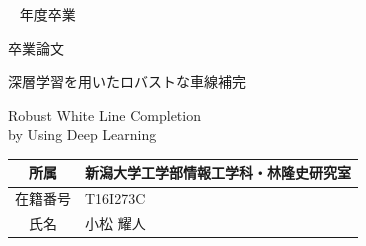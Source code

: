 \documentclass[a4j, 11pt]{jreport}
\newcounter{fiscal_year}         %
\begin{document}
\begin{titlepage}\Large ~
{\normalsize \the\value{fiscal_year} 年度卒業}
\vfill
\begin{center}

{\Huge 卒業論文}
\end{center}
\begin{center}

深層学習を用いたロバストな車線補完
\end{center}
\begin{center}

Robust White Line Completion \\
by Using Deep Learning
\end{center}
\vfill
\begin{center}
\begin{tabular}{|c|l|}
\hline

所属 & 新潟大学工学部情報工学科・林隆史研究室 \\
\hline

在籍番号 & T16I273C \\
\hline

氏名 & 小松 耀人 \\
\hline
\end{tabular}
\end{center}
\vspace{1cm}
\vfill
\end{titlepage}
\pagebreak
\addtocounter{page}{1}
\thispagestyle{empty}  %

\end{document}
